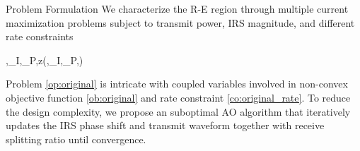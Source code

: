 \documentclass{IEEEtran}
\begin{document}
\begin{section}{Problem Formulation}
	We characterize the R-E region through multiple current maximization problems subject to transmit power, IRS magnitude, and different rate constraints
	\begin{maxi!}
		{\boldsymbol{\phi},_I,_P,\rho}{z(\boldsymbol{\phi},_I,_P,\rho)}{\label{op:original}}{\label{ob:original}}
		\label{co:original_power}
		\label{co:original_rate}
		\label{co:original_modulus}
	\end{maxi!}
	Problem \ref{op:original} is intricate with coupled variables involved in non-convex objective function \ref{ob:original} and rate constraint \ref{co:original_rate}. To reduce the design complexity, we propose an suboptimal AO algorithm that iteratively updates the IRS phase shift and transmit waveform together with receive splitting ratio until convergence.


\end{section}
\end{document}
